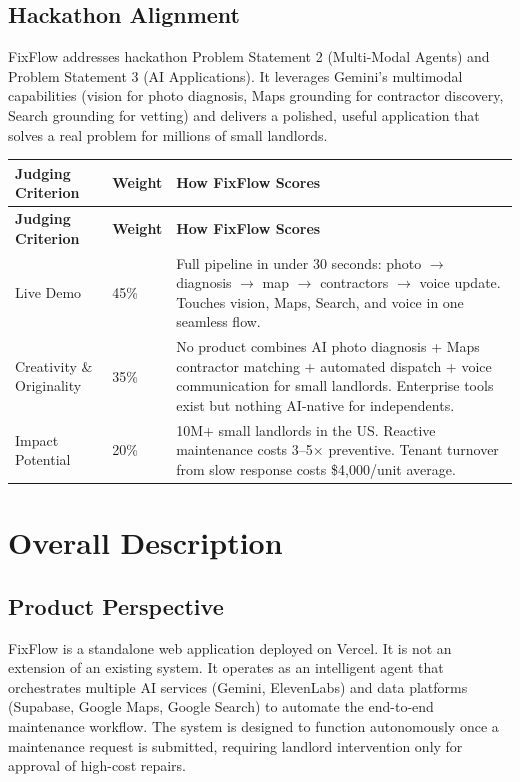 \documentclass[12pt,a4paper]{article}
\begin{document}
\subsection{Hackathon Alignment}

FixFlow addresses hackathon Problem Statement 2 (Multi-Modal Agents) and Problem Statement 3 (AI Applications). It leverages Gemini's multimodal capabilities (vision for photo diagnosis, Maps grounding for contractor discovery, Search grounding for vetting) and delivers a polished, useful application that solves a real problem for millions of small landlords.

\begin{longtable}{L{2.8cm} L{1.8cm} L{9cm}}
\toprule
\textbf{Judging Criterion} & \textbf{Weight} & \textbf{How FixFlow Scores} \\
\midrule
\endfirsthead
\toprule
\textbf{Judging Criterion} & \textbf{Weight} & \textbf{How FixFlow Scores} \\
\midrule
\endhead
\bottomrule
\endfoot
Live Demo & 45\% & Full pipeline in under 30 seconds: photo $\rightarrow$ diagnosis $\rightarrow$ map $\rightarrow$ contractors $\rightarrow$ voice update. Touches vision, Maps, Search, and voice in one seamless flow. \\
\midrule
Creativity \& Originality & 35\% & No product combines AI photo diagnosis + Maps contractor matching + automated dispatch + voice communication for small landlords. Enterprise tools exist but nothing AI-native for independents. \\
\midrule
Impact Potential & 20\% & 10M+ small landlords in the US. Reactive maintenance costs 3--5$\times$ preventive. Tenant turnover from slow response costs \$4,000/unit average. \\
\end{longtable}

\section{Overall Description}

\subsection{Product Perspective}

FixFlow is a standalone web application deployed on Vercel. It is not an extension of an existing system. It operates as an intelligent agent that orchestrates multiple AI services (Gemini, ElevenLabs) and data platforms (Supabase, Google Maps, Google Search) to automate the end-to-end maintenance workflow. The system is designed to function autonomously once a maintenance request is submitted, requiring landlord intervention only for approval of high-cost repairs.
\end{document}

